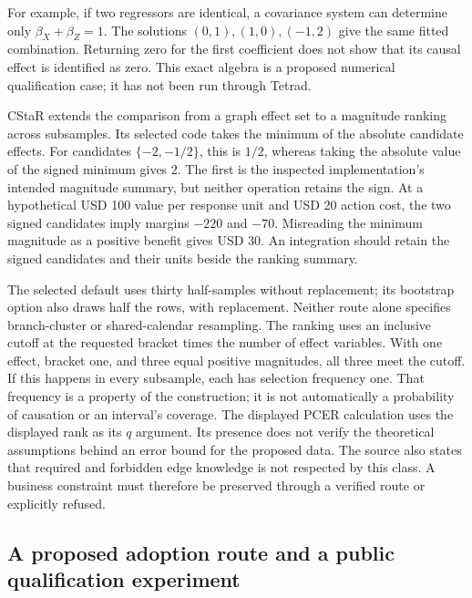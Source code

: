 For example, if two regressors are identical, a covariance system can determine
only $\beta_X+\beta_Z=1$. The solutions $(0,1),(1,0),(-1,2)$ give the
same fitted combination. Returning zero for the first coefficient does not
show that its causal effect is identified as zero. This exact algebra is a
proposed numerical qualification case; it has not been run through Tetrad.
\citep{exec20_javaeffects_reference}

CStaR extends the comparison from a graph effect set to a magnitude ranking
across subsamples. Its selected code takes the minimum of the absolute
candidate effects. For candidates $\{-2,-1/2\}$, this is $1/2$, whereas
taking the absolute value of the signed minimum gives $2$. The first is the
inspected implementation's intended magnitude summary, but neither operation
retains the sign. At a hypothetical USD 100 value per response unit and USD 20
action cost, the two signed candidates imply margins $-220$ and $-70$.
Misreading the minimum magnitude as a positive benefit gives USD 30. An
integration should retain the signed candidates and their units beside the
ranking summary.
\citep{exec20_javaeffects_tetrad,exec20_javaeffects_reference}

The selected default uses thirty half-samples without replacement; its
bootstrap option also draws half the rows, with replacement. Neither route
alone specifies branch-cluster or shared-calendar resampling. The ranking
uses an inclusive cutoff at the requested bracket times the number of effect
variables. With one effect, bracket one, and three equal positive magnitudes,
all three meet the cutoff. If this happens in every subsample, each has
selection frequency one. That frequency is a property of the construction;
it is not automatically a probability of causation or an interval's coverage.
The displayed PCER calculation uses the displayed rank as its $q$ argument.
Its presence does not verify the theoretical assumptions behind an error bound
for the proposed data. The source also states that required and forbidden
edge knowledge is not respected by this class. A business constraint must
therefore be preserved through a verified route or explicitly refused.
\citep{exec20_javaeffects_tetrad,exec20_javaeffects_reference}

\subsection{A proposed adoption route and a public qualification experiment}
\label{exec20:javafx-adoption}

